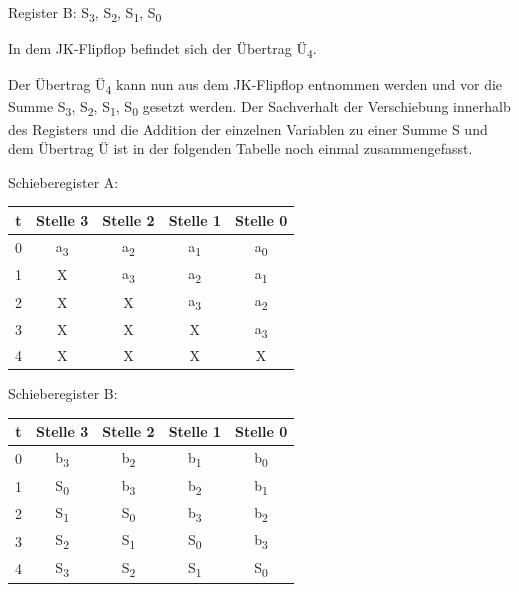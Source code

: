 Register B: S\textsubscript{3}, S\textsubscript{2}, S\textsubscript{1}, S\textsubscript{0}

In dem JK-Flipflop befindet sich der Übertrag Ü\textsubscript{4}.

Der Übertrag Ü\textsubscript{4} kann nun aus dem JK-Flipflop entnommen werden und vor die Summe S\textsubscript{3}, S\textsubscript{2}, S\textsubscript{1}, S\textsubscript{0} gesetzt werden. Der Sachverhalt der Verschiebung innerhalb des Registers und die Addition der einzelnen Variablen zu einer Summe S und dem Übertrag Ü ist in der folgenden Tabelle noch einmal zusammengefasst.

Schieberegister A:

\begin{table}[htbp]
  \centering
  \begin{tabular}{ccccc}
    \toprule
    t & Stelle 3 & Stelle 2 & Stelle 1 & Stelle 0 \\
    \midrule
    0 & a\textsubscript{3} & a\textsubscript{2} & a\textsubscript{1} & a\textsubscript{0} \\
    1 & X & a\textsubscript{3} & a\textsubscript{2} & a\textsubscript{1} \\
    2 & X & X & a\textsubscript{3} & a\textsubscript{2} \\
    3 & X & X & X & a\textsubscript{3} \\
    4 & X & X & X & X \\
    \bottomrule
  \end{tabular}
\end{table}

Schieberegister B:

\begin{table}[htbp]
  \centering
  \begin{tabular}{ccccc}
    \toprule
    t & Stelle 3 & Stelle 2 & Stelle 1 & Stelle 0 \\
    \midrule
    0 & b\textsubscript{3} & b\textsubscript{2} & b\textsubscript{1} & b\textsubscript{0} \\
    1 & S\textsubscript{0} & b\textsubscript{3} & b\textsubscript{2} & b\textsubscript{1} \\
    2 & S\textsubscript{1} & S\textsubscript{0} & b\textsubscript{3} & b\textsubscript{2} \\
    3 & S\textsubscript{2} & S\textsubscript{1} & S\textsubscript{0} & b\textsubscript{3} \\
    4 & S\textsubscript{3} & S\textsubscript{2} & S\textsubscript{1} & S\textsubscript{0} \\
    \bottomrule
  \end{tabular}
\end{table}

